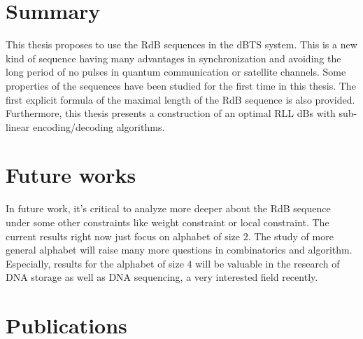 \section{Summary}
This thesis proposes to use the RdB sequences in the \gls{dBTS} system. This is a new kind of sequence having many advantages in synchronization and avoiding the long period of no pulses in quantum communication or satellite channels. Some properties of the sequences have been studied for the first time in this thesis. The first explicit formula of the maximal length of the \gls{RdB} sequence is also provided. Furthermore, this thesis presents a construction of an optimal RLL dBs with sub-linear encoding/decoding algorithms. 

\section{Future works}
In future work, it's critical to analyze more deeper about the RdB sequence under some other constraints like weight constraint or local constraint. The current results right now just focus on alphabet of size $2$. The study of more general alphabet will raise many more questions in combinatorics and algorithm. Especially, results for the alphabet of size $4$ will be valuable in the research of DNA storage as well as DNA sequencing, a very interested field recently.

{\color{red}\section{Publications}}



